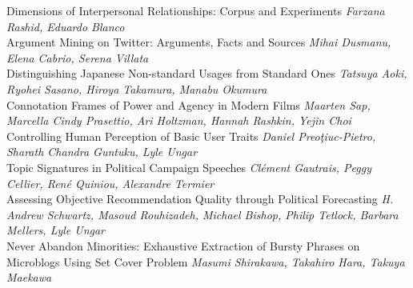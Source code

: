 \documentclass{book}
\begin{document}
    \noindent	Dimensions of Interpersonal Relationships: Corpus and Experiments \newline 
    {\itshape Farzana Rashid, Eduardo Blanco} \\
    
    \noindent	Argument Mining on Twitter: Arguments, Facts and Sources \newline 
    {\itshape Mihai Dusmanu, Elena Cabrio, Serena Villata} \\
    
    \noindent	Distinguishing Japanese Non-standard Usages from Standard Ones \newline 
    {\itshape Tatsuya Aoki, Ryohei Sasano, Hiroya Takamura, Manabu Okumura} \\
    
    \noindent	Connotation Frames of Power and Agency in Modern Films \newline 
    {\itshape Maarten Sap, Marcella Cindy Prasettio, Ari Holtzman, Hannah Rashkin, Yejin Choi} \\
    
    \noindent	Controlling Human Perception of Basic User Traits \newline 
    {\itshape Daniel Preoţiuc-Pietro, Sharath Chandra Guntuku, Lyle Ungar} \\
    
    \noindent	Topic Signatures in Political Campaign Speeches \newline 
    {\itshape Clément Gautrais, Peggy Cellier, René Quiniou, Alexandre Termier} \\
    
    \noindent	Assessing Objective Recommendation Quality through Political Forecasting \newline 
    {\itshape H. Andrew Schwartz, Masoud Rouhizadeh, Michael Bishop, Philip Tetlock, Barbara Mellers, Lyle Ungar} \\
    
    \noindent	Never Abandon Minorities: Exhaustive Extraction of Bursty Phrases on Microblogs Using Set Cover Problem \newline 
    {\itshape Masumi Shirakawa, Takahiro Hara, Takuya Maekawa} \\
    
\vspace*{\fill}
\end{document}
